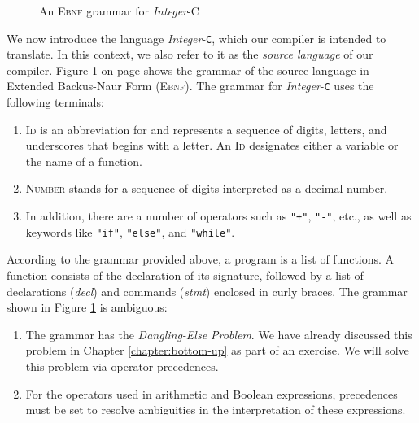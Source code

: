 \begin{figure}[!ht]
\begin{center}
\begin{minipage}[t]{12.5cm}
  \end{minipage}
  \end{center}
  \caption{An \textsc{Ebnf} grammar for \textsl{Integer}-\textsc{C}}
\label{fig:compiler.ebnf}
\end{figure}

\noindent
We now introduce the language \textsl{Integer}-\texttt{C}, which our compiler is intended to translate. In this context, we also refer to it as the \emph{source language} of our compiler. Figure \ref{fig:compiler.ebnf} on page \pageref{fig:compiler.ebnf} shows the grammar of the source language in Extended Backus-Naur Form (\textsc{Ebnf}). The grammar for \textsl{Integer}-\texttt{C} uses the following terminals:
\begin{enumerate}
\item \textsc{Id} is an abbreviation for  and represents a sequence of digits, letters, and underscores that begins with a letter. An \textsc{Id} designates either a variable or the name of a function.
\item \textsc{Number} stands for a sequence of digits interpreted as a decimal number.
\item In addition, there are a number of operators such as \texttt{"+"}, \texttt{"-"}, etc., as well as keywords like \texttt{"if"}, \texttt{"else"}, and \texttt{"while"}.
\end{enumerate}
According to the grammar provided above, a program is a list of functions. A function consists of the
declaration of its signature, followed by a list of declarations (\textsl{decl}) and commands (\textsl{stmt})
enclosed in curly braces.
The grammar shown
in Figure \ref{fig:compiler.ebnf} is ambiguous: 
\begin{enumerate}
\item The grammar has the \emph{Dangling-Else Problem}. We have already discussed this problem in Chapter
      \ref{chapter:bottom-up} as part of an exercise. We will solve this problem via operator precedences. 
\item For the operators used in arithmetic and Boolean expressions, precedences must be set to resolve
      ambiguities in the interpretation of these expressions. 
\end{enumerate}

